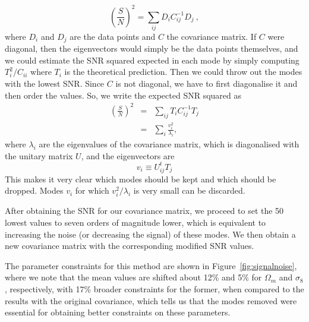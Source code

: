 \documentclass[twocolumn]{\docclass}
\newcommand{\rf}[1]{\ref{fig:#1}}
\newcommand\be{\begin{equation}}
\newcommand\ee{\end{equation}}
\def\bea{\begin{eqnarray}}
\def\eea{\end{eqnarray}}
\begin{document}
\be
\left(\frac{S}{N}\right)^2 = \sum_{ij} D_i C^{-1}_{ij} D_j\
,\ee
where $D_i$ and $D_j$ are the data points and $C$ the covariance matrix. If $C$ were diagonal, then the eigenvectors would simply be the data points themselves, and we could estimate the SNR squared expected in each mode by simply computing $T_i^2/C_{ii}$ where $T_i$ is the theoretical prediction. Then we could throw out the modes with the lowest SNR. Since $C$ is not diagonal, we have to first diagonalise it and then order the values. So, we write the expected SNR squared as
\bea
\left(\frac{S}{N}\right)^2 &=& \sum_{ij} T_i  C^{-1}_{ij} T_j\nonumber\\
&=& \sum_{i} \frac{v_i^2}{\lambda_i}
,\eea
where $\lambda_i$ are the eigenvalues of the covariance matrix, which is diagonalised with the unitary matrix $U$, and the eigenvectors are 
\be
v_i\equiv U_{ij}^t T_j
\ee
This makes it very clear which modes should be kept and which should be dropped. Modes $v_i$ for which $v_i^2/\lambda_i$ is very small can be discarded. 

After obtaining the SNR for our covariance matrix, we proceed to set the 50 lowest values to seven orders of magnitude lower, which is equivalent to increasing the noise (or decreasing the signal) of these modes. We then obtain a new covariance matrix with the corresponding modified SNR values. 


The parameter constraints for this method are shown in Figure~\rf{signalnoise}, where we note that the mean values are shifted about 12\% and 5\% for $\Omega_m$ and $\sigma_8$, respectively, with 17\% broader constraints for the former, when compared to the results with the original covariance, which tells us that the modes removed were essential for obtaining better constraints on these parameters. 
\end{document}
